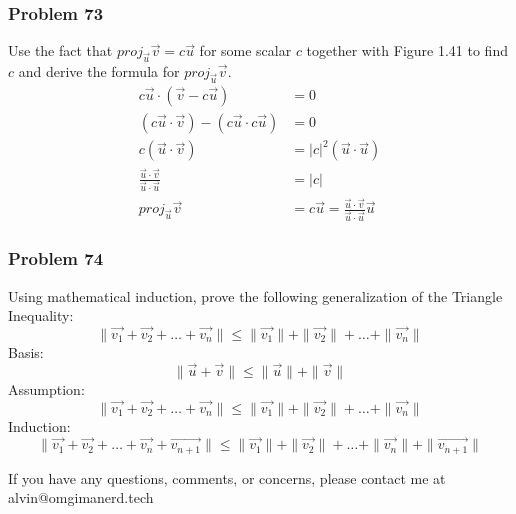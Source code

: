 \documentclass[letterpaper, 12pt]{math}
\begin{document}
\subsubsection*{Problem 73}
Use the fact that \( proj_{\vec{u}}\vec{v} = c\vec{u} \) for some scalar \( c \)
together with Figure 1.41 to find \( c \) and derive the formula for
\( proj_{\vec{u}}\vec{v} \).
\begin{align*}
  c\vec{u}\cdot(\vec{v}-c\vec{u}) &= 0 \\
  (c\vec{u}\cdot\vec{v})-(c\vec{u}\cdot c\vec{u}) &= 0 \\
  c(\vec{u}\cdot\vec{v}) &= |c|^2(\vec{u}\cdot\vec{u}) \\
  \frac{\vec{u}\cdot\vec{v}}{\vec{u}\cdot\vec{u}} &= |c| \\
  proj_{\vec{u}}\vec{v} &= c\vec{u} =
    \frac{\vec{u}\cdot\vec{v}}{\vec{u}\cdot\vec{u}}\vec{u}
\end{align*}

\subsubsection*{Problem 74}
Using mathematical induction, prove the following generalization of the
Triangle Inequality:
\[ \|\vec{v_1}+\vec{v_2}+\dots+\vec{v_n}\| \le
  \|\vec{v_1}\|+\|\vec{v_2}\|+\dots+\|\vec{v_n}\| \]
Basis:
\[ \|\vec{u}+\vec{v}\| \le \|\vec{u}\|+\|\vec{v}\| \]
Assumption:
\[ \|\vec{v_1}+\vec{v_2}+\dots+\vec{v_n}\| \le
  \|\vec{v_1}\|+\|\vec{v_2}\|+\dots+\|\vec{v_n}\| \]
Induction:
\[ \|\vec{v_1}+\vec{v_2}+\dots+\vec{v_n}+\vec{v_{n+1}}\| \le
  \|\vec{v_1}\|+\|\vec{v_2}\|+\dots+\|\vec{v_n}\|+\|\vec{v_{n+1}}\| \]

\begin{center}
  If you have any questions, comments, or concerns, please contact me at
  alvin@omgimanerd.tech
\end{center}
\end{document}
